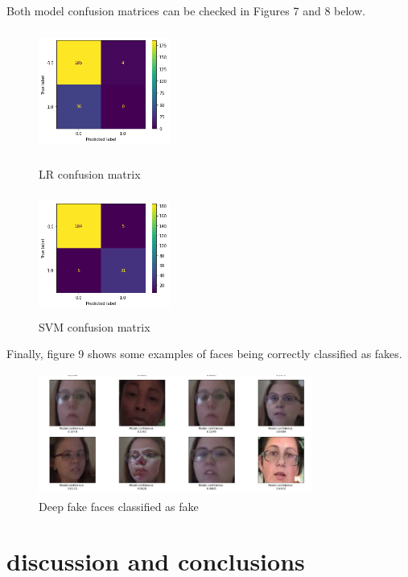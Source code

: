 \documentclass{bmvc2k}
\begin{document}
Both model confusion matrices can be checked in Figures 7 and 8 below.

\begin{figure}[!h]
  \centering
  \begin{minipage}[b]{0.4\textwidth}
    \includegraphics[width=4.3cm, height=4cm]{Figs/lr-confusion-matrix.png}
    \caption{LR confusion matrix}
  \end{minipage}
  \hfill
  \begin{minipage}[b]{0.4\textwidth}
    \includegraphics[width=4.3cm, height=4cm]{Figs/svm-confusion-matrix.png}
    \caption{SVM confusion matrix}
  \end{minipage}
\end{figure}

Finally, figure 9 shows some examples of faces being correctly classified as fakes.

\begin{figure}[!h]
\centering
\includegraphics[width=9cm, height=4cm]{Figs/results.png}
    \caption{Deep fake faces classified as fake}
\end{figure}

\section{discussion and conclusions}
\end{document}
